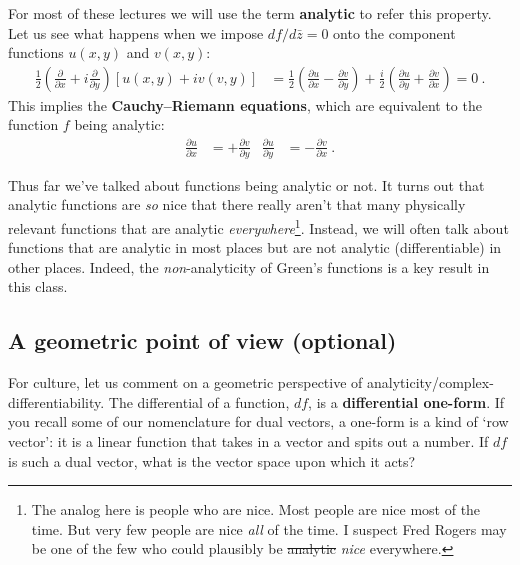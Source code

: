 For most of these lectures we will use the term \textbf{analytic} to refer this property. Let us see what happens when we impose $df/d\bar{z} = 0$ onto the component functions $u(x,y)$ and $v(x,y)$:
\begin{align}
	\frac{1}{2}\left(\frac{\partial}{\partial x} + i \frac{\partial}{\partial y}\right)
	\left[u(x,y)+iv(v,y)\right]
	&= 
	\frac{1}{2}
	\left( \frac{\partial u}{\partial x} - \frac{\partial v}{\partial y} \right)
	+
	\frac{i}{2}
	\left( \frac{\partial u}{\partial y} + \frac{\partial v}{\partial x} \right)
	= 0 \ .
\end{align}
This implies the \textbf{Cauchy--Riemann equations}, which are equivalent to the function $f$ being analytic:
\begin{align}
	\frac{\partial u}{\partial x} & = +\frac{\partial v}{\partial y}
	&
	\frac{\partial u}{\partial y} & = -\frac{\partial v}{\partial x} \ .
\end{align}

Thus far we've talked about functions being analytic or not. It turns out that analytic functions are \emph{so} nice that there really aren't that many physically relevant functions that are analytic \emph{everywhere}\footnote{The analog here is people who are nice. Most people are nice most of the time. But very few people are nice \emph{all} of the time. I suspect Fred Rogers may be one of the few who could plausibly be \sout{analytic} \emph{nice} everywhere.}. Instead, we will often talk about functions that are analytic in most places but are not analytic (differentiable) in other places. Indeed, the \emph{non}-analyticity of Green's functions is a key result in this class.

\subsection{A geometric point of view (optional)}
\label{sec:analytic:geometric}

For culture, let us comment on a geometric perspective of analyticity/complex-differentiability. The differential of a function, $df$, is a \textbf{differential one-form}. If you recall some of our nomenclature for dual vectors, a one-form is a kind of `row vector': it is a linear function that takes in a vector and spits out a number. If $df$ is such a dual vector, what is the vector space upon which it acts?

